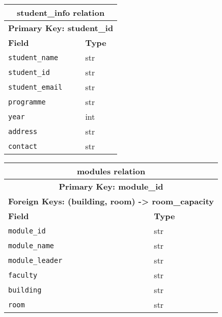 \documentclass{article}
\begin{document}
\begin{table}[H]
    \centering
    \begin{tabularx}{\textwidth}{|X|X|}
    \hline
    \multicolumn{2}{|c|}{\textbf{student\_info relation}} \\
    \hline
        \multicolumn{2}{|c|}{\textbf{Primary Key: student\_id}} \\
        \hline
        \textbf{Field} & \textbf{Type} \\
        \hline
        \verb|student_name| & str \\
        \hline
        \verb|student_id| & str \\
        \hline
        \verb|student_email| & str \\
        \hline
        \verb|programme| & str \\
        \hline
        \verb|year| & int \\
        \hline
        \verb|address| & str \\
        \hline
        \verb|contact| & str \\
        \hline
    \end{tabularx}
\end{table}

\begin{table}[H]
    \centering
    \begin{tabularx}{\textwidth}{|X|X|} %
    \hline
    \multicolumn{2}{|c|}{\textbf{modules relation}} \\
        \hline
    \multicolumn{2}{|c|}{\textbf{Primary Key: module\_id}} \\
    \hline
    \multicolumn{2}{|c|}{\textbf{Foreign Keys: (building, room) -> room\_capacity}} \\
    \hline
        \textbf{Field} & \textbf{Type} \\
        \hline
        \verb|module_id| & str \\
        \hline
        \verb|module_name| & str \\
        \hline
        \verb|module_leader| & str \\
        \hline
        \verb|faculty| & str \\
        \hline
        \verb|building| & str \\
        \hline
        \verb|room| & str \\
        \hline
    \end{tabularx}
\end{table}
\end{document}
